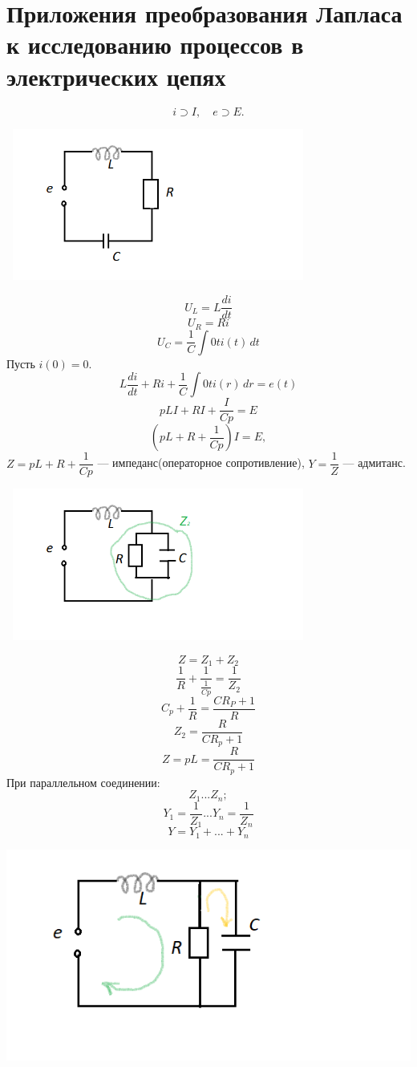 \section{Приложения преобразования Лапласа к исследованию процессов в электрических цепях}
\[
	i \supset I, \quad e \supset E.
\]
\begin{center}
\includegraphics[width=10cm, height=5cm]{ch12/10}
\end{center}
\[
	U_L=L \dfrac{di}{dt}
\]
\[
	U_R = Ri
\]
\[
	U_C = \dfrac{1}{C} \int \limits{0}{t}i(t) \, dt
\]
Пусть \(i(0)=0\).\\
\[
	L\dfrac{di}{dt} + Ri+\dfrac{1}{C} \int \limits{0}{t}i(r) \, dr = e(t)
 \]
 \[
 	pLI + RI + \dfrac{I}{Cp} = E
 \]
 \[
 	(pL+R+\dfrac{1}{Cp})I = E,
 \]
\(Z = pL+R+\dfrac{1}{Cp}\) --- импеданс(операторное сопротивление), \(Y=\dfrac{1}{Z}\) --- адмитанс.\\
\begin{center}
\includegraphics[width=10cm, height=5cm]{ch12/11}
\end{center}
\[
	Z = Z_1 + Z_2
\]
\[
	\dfrac{1}{R} + \dfrac{1}{\frac{1}{Cp}} = \dfrac{1}{Z_2}
\]
\[
	C_p + \dfrac{1}{R} = \dfrac{CR_P + 1}{R}
\]
\[
	Z_2 = \dfrac{R}{CR_p + 1}
\]
\[
	Z= pL = \dfrac{R}{CR_p+1}
\]
При параллельном соединении:
\[
	Z_1...Z_n;
\]
\[
	Y_1 = \dfrac{1}{Z_1}...Y_n = \dfrac{1}{Z_n}
\]
\[
	Y = Y_1 + ... + Y_n
\]
\begin{center}
\includegraphics[width=14cm, height=7cm]{ch12/12}
\end{center}

